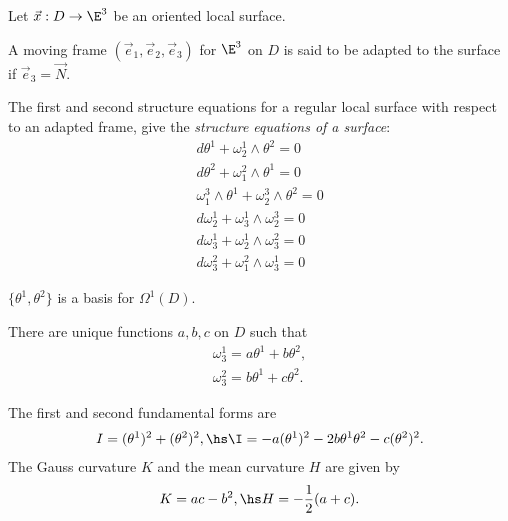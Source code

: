 \documentclass{article}
\begin{document}
Let $\vec x: D \to \E^3$ be an oriented local surface.

\begin{definition}[Notes 11.1]
    A moving frame $(\vec e_1, \vec e_2, \vec e_3)$ for $\E^3$ on $D$
    is said to be adapted to the surface if $\vec e_3 = \vec N$.
\end{definition}

\begin{proposition}[Notes 11.2]
    The first and second structure equations for a regular local surface 
    with respect to an adapted frame, give the \emph{structure equations
    of a surface}:
    \begin{align*}
        d\theta^1 + \omega_2^1\wedge\theta^2 = 0\\
        d\theta^2 + \omega_1^2\wedge\theta^1 = 0\\
        \omega_1^3\wedge\theta^1 + \omega_2^3\wedge\theta^2 = 0\\
        d\omega_2^1+\omega_3^1\wedge\omega_2^3 = 0\\
        d\omega_3^1 + \omega_2^1 \wedge \omega_3^2 = 0\\
        d\omega_3^2 + \omega_1^2 \wedge \omega_3^1 = 0
    \end{align*}
\end{proposition}

\begin{lemma}[Notes 11.3]
    $\{\theta^1, \theta^2\}$ is a basis for $\Omega^1(D)$. 
\end{lemma}

\begin{lemma}
    There are unique functions $a,b,c$ on $D$ such that 
    \begin{align*}
        \omega_3^1 = a\theta^1+b\theta^2,\\
        \omega_3^2 = b\theta^1+c\theta^2.
    \end{align*}
\end{lemma}

\begin{proposition}
    The first and second fundamental forms are 
    \begin{align*}
        I = (\theta^1)^2 + (\theta^2)^2,\hs 
        \I = -a(\theta^1)^2-2b\theta^1\theta^2-c(\theta^2)^2.
    \end{align*}
    The Gauss curvature $K$ and the mean curvature $H$ are given by 
    \begin{align*}
        K=ac-b^2, \hs H=-\frac{1}{2}(a+c).
    \end{align*}
\end{proposition}
\end{document}
